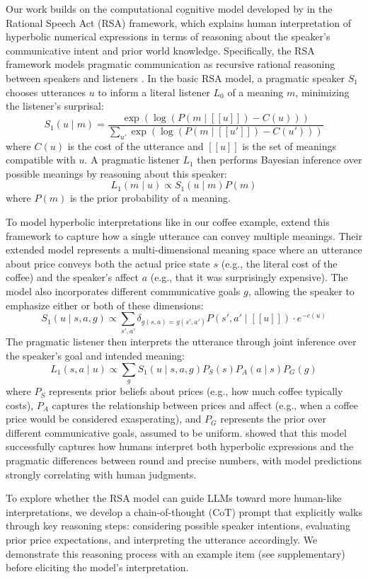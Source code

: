 
Our work builds on the computational cognitive model developed by \citet{kao2014nonliteral} in the Rational Speech Act (RSA) framework, which explains human interpretation of hyperbolic numerical expressions in terms of reasoning about the speaker's  communicative intent and prior world knowledge.
Specifically, the RSA framework models pragmatic communication as recursive rational reasoning between speakers and listeners \citep{goodman2016pragmatic, degen2023rational}. In the basic RSA model, a pragmatic speaker $S_1$ chooses utterances $u$ to inform a literal listener $L_0$ of a meaning $m$, minimizing the listener's surprisal: 
$$S_1(u \mid m) = \frac{\exp(\log(P(m \mid [\![u]\!])-C(u)))}{\sum_{u'} \exp(\log( P(m \mid [\![u']\!] ) - C(u')))} $$
where $C(u)$ is the cost of the utterance and $[\![u]\!]$ is the set of meanings compatible with $u$. A pragmatic listener $L_1$ then performs Bayesian inference over possible meanings by reasoning about this speaker:
$$ L_1(m \mid u)\propto S_1(u \mid m) P(m)$$
where $P(m)$ is the prior probability of a meaning.

To model hyperbolic interpretations like in our coffee example, \citet{kao2014nonliteral} extend this framework to capture how a single utterance can convey multiple meanings. Their extended model represents a multi-dimensional meaning space where an utterance about price conveys both the actual price state $s$ (e.g., the literal cost of the coffee) and the speaker's affect $a$ (e.g., that it was surprisingly expensive). The model also incorporates different communicative goals $g$, allowing the speaker to emphasize either or both of these dimensions: %
$$S_1 (u \mid s, a, g) \propto \sum_{s', a'} \delta_{g(s, a) = g(s', a')}P(s', a' \mid [\![u]\!]) \cdot e^{-c(u)}$$
The pragmatic listener then interprets the utterance through joint inference over the speaker's goal and intended meaning:
$$L_1(s, a \mid u) \propto \sum_{g} S_1(u \mid s, a, g) P_{S}(s) P_{A}(a\mid s) P_{G}(g) $$
where $P_{S}$ represents prior beliefs about prices (e.g., how much coffee typically costs), $P_{A}$ captures the relationship between prices and affect (e.g., when a coffee price would be considered exasperating), and $P_{G}$ represents the prior over different communicative goals, assumed to be uniform. \citet{kao2014nonliteral} showed that this model successfully captures how humans interpret both hyperbolic expressions and the pragmatic differences between round and precise numbers, with model predictions strongly correlating with human judgments.

To explore whether the RSA model can guide LLMs toward more human-like interpretations, we develop a chain-of-thought (CoT) prompt that explicitly walks through key reasoning steps: considering possible speaker intentions, evaluating prior price expectations, and interpreting the utterance accordingly. We demonstrate this reasoning process with an example item (see supplementary) before eliciting the model's interpretation.

